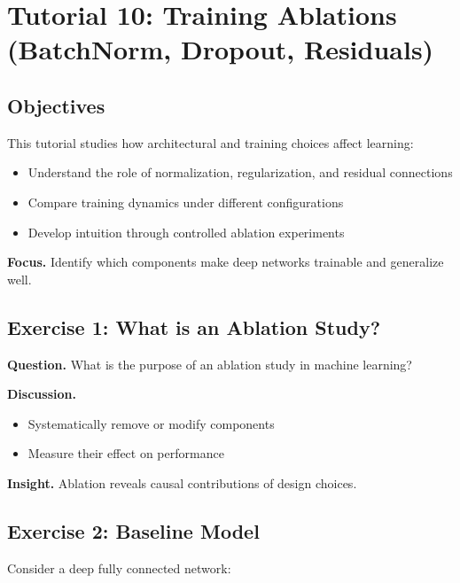 \section{Tutorial 10: Training Ablations (BatchNorm, Dropout, Residuals)}

\subsection{Objectives}

This tutorial studies how architectural and training choices affect learning:

\begin{itemize}
    \item Understand the role of normalization, regularization, and residual connections
    \item Compare training dynamics under different configurations
    \item Develop intuition through controlled ablation experiments
\end{itemize}

\medskip

\noindent
\textbf{Focus.}  
Identify which components make deep networks trainable and generalize well.

\subsection{Exercise 1: What is an Ablation Study?}

\textbf{Question.}  
What is the purpose of an ablation study in machine learning?

\medskip

\noindent
\textbf{Discussion.}

\begin{itemize}
    \item Systematically remove or modify components
    \item Measure their effect on performance
\end{itemize}

\medskip

\noindent
\textbf{Insight.}  
Ablation reveals causal contributions of design choices.

\subsection{Exercise 2: Baseline Model}

Consider a deep fully connected network:

